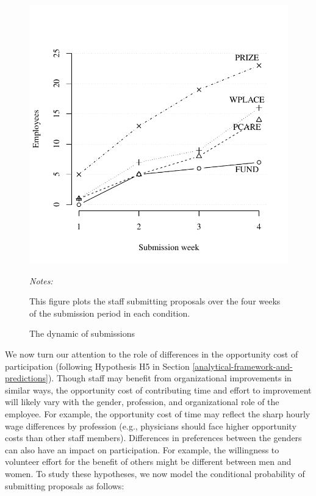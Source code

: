 \documentclass[12pt, titlepage]{article}
\newenvironment{tablenotes}[1][]{
  \begin{minipage}{\textwidth}\emph{Notes:}{\footnotesize #1}
}{\end{minipage}}
\begin{document}
\begin{figure} 
  \centering
  \caption{The dynamic of submissions}
  \label{fig: dynamic}
  \includegraphics{Figures/dynamic-1.pdf}
  \begin{tablenotes}
  This figure plots the staff submitting proposals over the four weeks of the submission period in each condition. 
  \end{tablenotes}
\end{figure}

We now turn our attention to the role of differences in the opportunity
cost of participation (following Hypothesis H5 in Section
\ref{analytical-framework-and-predictions}). Though staff may benefit
from organizational improvements in similar ways, the opportunity cost
of contributing time and effort to improvement will likely vary with the
gender, profession, and organizational role of the employee. For
example, the opportunity cost of time may reflect the sharp hourly wage
differences by profession (e.g., physicians should face higher
opportunity costs than other staff members). Differences in preferences
between the genders can also have an impact on participation. For
example, the willingness to volunteer effort for the benefit of others
might be different between men and women. To study these hypotheses, we
now model the conditional probability of submitting proposals as
follows:
\end{document}

